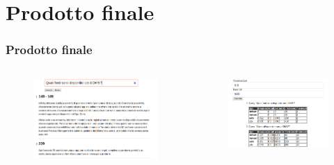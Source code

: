 \documentclass{beamer}
\begin{document}
\section{Prodotto finale}
\begin{frame}
	\frametitle{Prodotto finale}

	\begin{columns}
		\begin{column}{0.6\textwidth}
			\begin{figure}
				\vspace{-8em}
				\hspace*{1em}
				\centering
				\includegraphics[width=\textwidth]{img/ricerca.png}
			\end{figure}
		\end{column}
		\begin{column}{0.6\textwidth}
			\begin{figure}
				\vspace*{3em}
				\hspace{-2.5em}
				\centering
				\includegraphics[width=\textwidth]{img/ir_eval.png}
			\end{figure}
		\end{column}
	\end{columns}



\end{frame}
\end{document}
